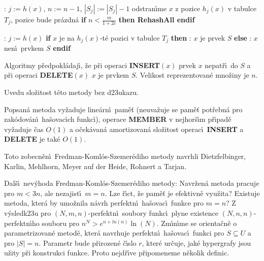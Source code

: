 \documentclass[a4paper,12pt]{article}
\begin{document}
:\newline 
$j:=h(x)$, $n:=n-1$, $|S_j|:=|S_j|-1$\newline 
odstran\'\i me $x$ z pozice $h_j(x)$ v tabulce $T_j$, pozice bude pr\'azdn\'a \newline 
{\bf if} $n<\frac m{1+2c}$ {\bf then RehashAll endif}
\bigskip

: \newline 
$j:=h(x)$\newline 
{\bf if} $x$ je na $h_j(x)$-t\'e pozici v tabulce $T_j$ {\bf then}\newline 
\phantom{---}{\bf V\'ystup}: $x$ je prvek $S$ \newline 
{\bf else}\newline 
\phantom{---}{\bf V\'ystup}: $x$ nen\'\i\ prvkem $S$\newline 
{\bf endif}
\bigskip

\flushpar Algoritmy p\v redpokl\'adaj\'\i , \v ze p\v ri operaci {\bf INSERT$
(x)$} prvek $x$ nepat\v r\'\i\ do $S$ a p\v ri operaci {\bf DELETE$(x)$} $
x$ je prvkem $S$. Velikost reprezentovan\'e mno\v ziny je $n$. 
\medskip

\flushpar Uvedu slo\v zitost t\'eto metody bez d\accent23ukazu.
\medskip

Popsan\'a metoda vy\v zaduje line\'arn\'\i\ pam\v e\v t 
(neuva\v zuje se pam\v e\v t pot\v rebn\'a pro zak\'odo\-v\'a\-n\'\i\ ha\v sovac\'\i ch funkc\'\i ), operace {\bf MEMBER }
v nej\-hor\v s\'\i m p\v r\'\i pad\v e vy\v zaduje \v cas $O(1)$ a o\v cek\'avan\'a 
amortizovan\'a slo\v zitost operac\'\i\ {\bf INSERT} a {\bf DELETE} je tak\'e $
O(1)$.
\endproclaim

\flushpar Toto zobecn\v en\'\i\ Fredman-Koml\'os-Szemer\'ediho metody navrhli 
Dietzfelbinger, Karlin, Mehl\-horn, Meyer auf der Heide, Rohnert 
a Tarjan.
\bigskip

\flushpar Dal\v s\'\i\ nev\'yhoda Fredman-Koml\'os-Szemer\'ediho metody:\newline 
Navr\v zen\'a metoda pracuje pro $m<3n$, ale nezajist\'\i\ $m=n$. 
Lze \v r\'\i ct, \v ze pam\v e\v t je efektivn\v e vyu\v zita? Existuje 
metoda, kter\'a by umo\v znila n\'avrh perfektn\'\i\ ha\v sovac\'\i\ 
funkce pro $m=n$? Z v\'ysledk\accent23u pro 
$(N,m,n)$-perfektn\'\i\ soubory funkc\'\i\ plyne existence 
$(N,n,n)$-perfektn\'\i ho souboru pro $n^N>e^{n+ln(n)}\ln(N)$. 
Zm\'\i n\'\i me se orienta\v cn\v e o parametrizovan\'e metod\v e, kter\'a 
navr\-huje perfektn\'\i\ ha\v sovac\'\i\ funkci pro $S\subseteq U$ a pro 
$|S|=n$. Parametr bude p\v rirozen\'e \v c\'\i slo $r$, kter\'e ur\v cuje, 
jak\'e hypergrafy jsou u\v zity p\v ri konstrukci funkce. Proto 
nejd\v r\'\i ve p\v ripomeneme n\v ekolik definic.
\end{document}
